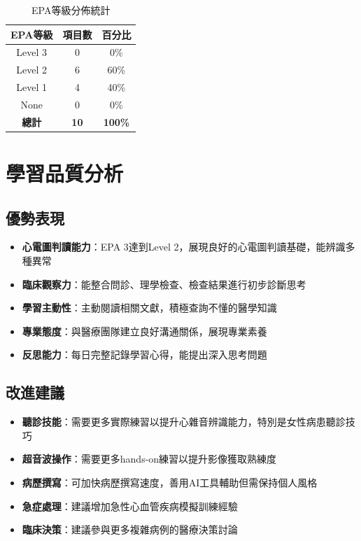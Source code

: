 \documentclass[12pt,a4paper]{article}
\begin{document}
\begin{table}[h]
\centering
\caption{EPA等級分佈統計}
\begin{tabular}{|c|c|c|}
\hline
\textbf{EPA等級} & \textbf{項目數} & \textbf{百分比} \\
\hline
Level 3 & 0 & 0\% \\
Level 2 & 6 & 60\% \\
Level 1 & 4 & 40\% \\
None & 0 & 0\% \\
\hline
\textbf{總計} & \textbf{10} & \textbf{100\%} \\
\hline
\end{tabular}
\end{table}

\section{學習品質分析}

\subsection{優勢表現}

\begin{itemize}
\item \textbf{心電圖判讀能力}：EPA 3達到Level 2，展現良好的心電圖判讀基礎，能辨識多種異常
\item \textbf{臨床觀察力}：能整合問診、理學檢查、檢查結果進行初步診斷思考
\item \textbf{學習主動性}：主動閱讀相關文獻，積極查詢不懂的醫學知識
\item \textbf{專業態度}：與醫療團隊建立良好溝通關係，展現專業素養
\item \textbf{反思能力}：每日完整記錄學習心得，能提出深入思考問題
\end{itemize}

\subsection{改進建議}

\begin{itemize}
\item \textbf{聽診技能}：需要更多實際練習以提升心雜音辨識能力，特別是女性病患聽診技巧
\item \textbf{超音波操作}：需要更多hands-on練習以提升影像獲取熟練度
\item \textbf{病歷撰寫}：可加快病歷撰寫速度，善用AI工具輔助但需保持個人風格
\item \textbf{急症處理}：建議增加急性心血管疾病模擬訓練經驗
\item \textbf{臨床決策}：建議參與更多複雜病例的醫療決策討論
\end{itemize}
\end{document}
